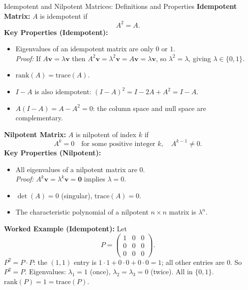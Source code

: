 \documentclass[12pt,a4paper]{article}
\begin{document}
\begin{infobox}{Idempotent and Nilpotent Matrices: Definitions and Properties}
\textbf{Idempotent Matrix:} $A$ is idempotent if
\[
  A^2 = A.
\]
\textbf{Key Properties (Idempotent):}
\begin{itemize}
  \item Eigenvalues of an idempotent matrix are only $0$ or $1$.\\
    \emph{Proof:} If $A\mathbf{v} = \lambda\mathbf{v}$ then $A^2\mathbf{v} = \lambda^2\mathbf{v} = A\mathbf{v} = \lambda\mathbf{v}$, so $\lambda^2 = \lambda$, giving $\lambda \in \{0,1\}$.
  \item $\text{rank}(A) = \text{trace}(A)$.
  \item $I - A$ is also idempotent: $(I-A)^2 = I - 2A + A^2 = I - A$.
  \item $A(I - A) = A - A^2 = 0$: the column space and null space are complementary.
\end{itemize}

\textbf{Nilpotent Matrix:} $A$ is nilpotent of index $k$ if
\[
  A^k = 0 \quad \text{for some positive integer } k, \quad A^{k-1} \neq 0.
\]
\textbf{Key Properties (Nilpotent):}
\begin{itemize}
  \item All eigenvalues of a nilpotent matrix are $0$.\\
    \emph{Proof:} $A^k\mathbf{v} = \lambda^k\mathbf{v} = \mathbf{0}$ implies $\lambda = 0$.
  \item $\det(A) = 0$ (singular), $\text{trace}(A) = 0$.
  \item The characteristic polynomial of a nilpotent $n\times n$ matrix is $\lambda^n$.
\end{itemize}
\end{infobox}

\textbf{Worked Example (Idempotent):} Let
\[
  P = \begin{pmatrix} 1 & 0 & 0 \\ 0 & 0 & 0 \\ 0 & 0 & 0 \end{pmatrix}.
\]
$P^2 = P \cdot P$: the $(1,1)$ entry is $1\cdot1 + 0\cdot0 + 0\cdot0 = 1$; all other entries are $0$.
So $P^2 = P$. \quad \checkmark
Eigenvalues: $\lambda_1 = 1$ (once), $\lambda_2 = \lambda_3 = 0$ (twice). All in $\{0, 1\}$. \quad \checkmark
$\text{rank}(P) = 1 = \text{trace}(P)$. \quad \checkmark
\end{document}
